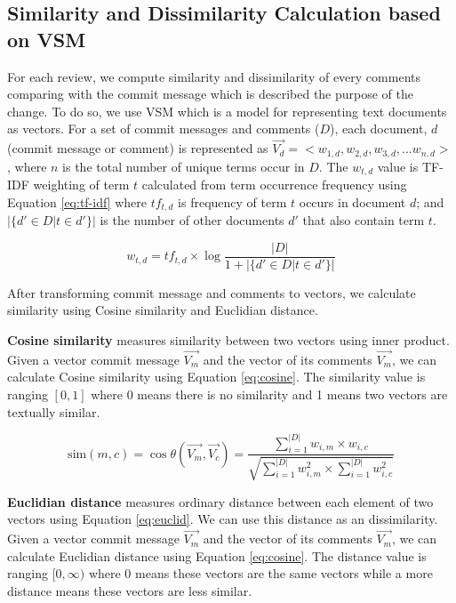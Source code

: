 \subsection{Similarity and Dissimilarity Calculation based on VSM}
For each review, we compute similarity and dissimilarity of every comments comparing with the commit message which is described the purpose of the change.
To do so, we use VSM which is a model for representing text documents as vectors. For a set of commit messages and comments ($D$), each document, $d$ (commit message or comment) is represented as $\overrightarrow{V_d} = <w_{1,d},w_{2,d},w_{3,d},...w_{n,d}>$, where $n$ is the total number of unique terms occur in $D$. The $w_{t,d}$ value is TF-IDF weighting of term $t$ calculated from term occurrence frequency using Equation \ref{eq:tf-idf} where $tf_{t,d}$ is frequency of term $t$ occurs in document $d$; and $|\{d' \in D | t \in d'\}|$ is the number of other documents $d'$ that also contain term $t$.  

\begin{equation}
w_{t,d} = tf_{t,d} \times \log\frac{|D|}{1+|\{d' \in D | t \in d'\}|}
\label{eq:tf-idf}
\end{equation}

After transforming commit message and comments to vectors, we calculate similarity using Cosine similarity and Euclidian distance. 


\noindent\textbf{Cosine similarity} measures similarity between two vectors using inner product. Given a vector commit message $\overrightarrow{V_m}$ and the vector of its comments $\overrightarrow{V_m}$, we can calculate Cosine similarity using Equation \ref{eq:cosine}. The similarity value is ranging $[0,1]$ where 0 means there is no similarity and 1 means two vectors are textually similar.  

\begin{equation}
\mathrm{sim}(m,c) = \cos\theta(\overrightarrow{V_m},\overrightarrow{V_c}) = \frac{\sum_{i=1}^{|D|} w_{i,m} \times w_{i,c}}{\sqrt{\sum_{i=1}^{|D|} w^2_{i,m} \times \sum_{i=1}^{|D|} w^2_{i,c}}}
\label{eq:cosine}
\end{equation}

\noindent\textbf{Euclidian distance} measures ordinary distance between each element of two vectors using Equation \ref{eq:euclid}. We can use this distance as an dissimilarity. Given a vector commit message $\overrightarrow{V_m}$ and the vector of its comments $\overrightarrow{V_m}$, we can calculate Euclidian distance using Equation \ref{eq:cosine}. The distance value is ranging $[0,\infty)$ where 0 means these vectors are the same vectors while a more distance means these vectors are less similar.

